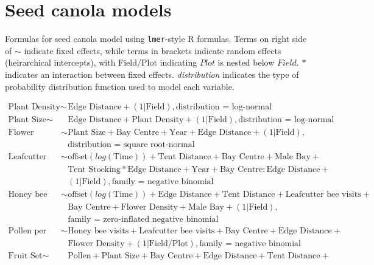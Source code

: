 \section*{Seed canola models}

Formulas for seed canola model using \texttt{lmer}-style R formulas. Terms on right side of $\sim$ indicate fixed effects, while terms in brackets indicate random effects (heirarchical intercepts), with Field$/$Plot indicating $Plot$ is nested below $Field$. $*$ indicates an interaction between fixed effects. \textit{distribution} indicates the type of probability distribution function used to model each variable.

\begin{align*}
    \text{Plant Density} \sim & \text{Edge Distance} + (1|\text{Field}), \text{distribution = log-normal} \\
    \text{Plant Size} \sim & \text{Edge Distance} + \text{Plant Density} + (1|\text{Field}) ,\text{distribution = log-normal} \\
    \text{Flower Density} \sim & \text{Plant Size} + \text{Bay Centre} + \text{Year} + \text{Edge Distance} + (1|\text{Field}), \\
    &   \text{distribution = square root-normal} \\
    \text{Leafcutter bee visits} \sim & \text{offset}(log(\text{Time})) + \text{Tent Distance} + \text{Bay Centre} + \text{Male Bay} + \\ 
    &   \text{Tent Stocking}*\text{Edge Distance} + \text{Year} + \text{Bay Centre}:\text{Edge Distance} +\\ 
    &   (1|\text{Field}), \text{family = negative binomial} \\
    \text{Honey bee visits} \sim & \text{offset}(log(\text{Time})) + \text{Edge Distance} + \text{Tent Distance} + \text{Leafcutter bee visits} +\\
    &   \text{Bay Centre} + \text{Flower Density} + \text{Male Bay} + (1|\text{Field}),\\
    &   \text{family = zero-inflated negative binomial} \\
    \text{Pollen per Stigma} \sim & \text{Honey bee visits} + \text{Leafcutter bee visits} + \text{Bay Centre} + \text{Edge Distance} +\\
    &   \text{Flower Density} + (1|\text{Field/Plot}), \text{family = negative binomial} \\
    \text{Fruit Set} \sim & \text{Pollen} + \text{Plant Size} + \text{Bay Centre} + \text{Edge Distance} + \text{Tent Distance} + \\

\end{align*}
